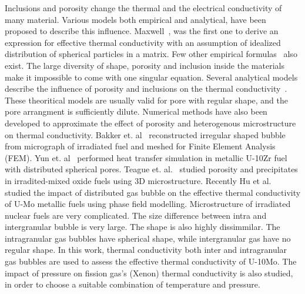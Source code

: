 \begin{doublespacing}
Inclusions and porosity change the thermal and the electrical conductivity of many material. Various models both empirical and analytical, have been proposed to describe this influence. Maxwell~\cite{maxwell1881treatise}, was the first one to derive an expression for effective thermal conductivity with an assumption of idealized distribution of spherical particles in a matrix. Few other empirical formulas~\cite{macewan1967effect,goldsmith1973measurements,devries1989experimental} also exist. The large diversity of shape, porosity and inclusion inside the materials make it impossible to come with one singular equation. Several analytical models describe the influence of porosity and inclusions on the thermal conductivity~\cite{maxwell1881treatise,loeb1954thermal, cunningham1981heat, tzou1991effect, bauer1993general}. These theoritical models are usually valid for pore with regular shape, and the pore arrangment is sufficiently dilute. Numerical methods have also been developed to approximate the effect of porosity and heterogenous microstructure on thermal conductivity. Bakker et. al~\cite{bakker1995determination, bakker1997using} reconstructed irregular shaped bubble from micrograph of irradiated fuel and meshed for Finite Element Analysis (FEM). Yun et. al~\cite{yun2014simulation} performed heat transfer simulation in metallic U-10Zr fuel with distributed spherical pores. Teague et. al.~\cite{teague2014using} studied porosity and precipitates in irradited-mixed oxide fuels using 3D microstructure. Recently Hu et al.~\cite{hu2015assessment} studied the impact of distributed gas bubble on the effective thermal conductivity of U-Mo metallic fuels using phase field modelling. Microstructure of irradiated nuclear fuels are very complicated. The size difference between intra and intergranular bubble is very large. The shape is also highly dissimmilar. The intragranular gas bubbles have spherical shape, while intergranular gas have no regular shape. In this work, thermal conductivity  both inter and intragranular gas bubbles are used to assess the effective thermal conductivity of U-10Mo. The impact of pressure on fission gas's (Xenon) thermal conductivity is also studied, in order to choose a suitable combination of temperature and pressure. 



\end{doublespacing}



